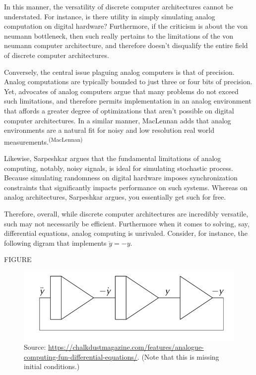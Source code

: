 In this manner, the versatility of discrete computer architectures cannot be understated. For instance, is there utility in simply simulating analog computation on digital hardware? Furthermore, if the criticism is about the von neumann bottleneck, then such really pertains to the limitations of the von neumann computer architecture, and therefore doesn't disqualify the entire field of discrete computer architectures.

Conversely, the central issue plaguing analog computers is that of precision. Analog computations are typically bounded to just three or four bits of precision. Yet, advocates of analog computers argue that many problems do not exceed such limitations, and therefore permits implementation in an analog environment that affords a greater degree of optimizations that aren't possible on digital computer architectures. In a similar manner, MacLennan adds that analog environments are a natural fit for noisy and low resolution real world measurements.\textsuperscript{(MacLennan)}

Likewise, Sarpeshkar argues that the fundamental limitations of analog computing, notably, noisy signals, is ideal for simulating stochastic process. Because simulating randomness on digital hardware imposes synchronization constraints that significantly impacts performance on such systems. Whereas on analog architectures, Sarpeshkar argues, you essentially get such for free.

Therefore, overall, while discrete computer architectures are incredibly versatile, such may not necessarily be efficient. Furthermore when it comes to solving, say, differential equations, analog computing is unrivaled. Consider, for instance, the following digram that implements $\ddot{y} = -y$. 

\ifpdf
  FIGURE
\else
  \begin{figure}[H]
    \centering
    \includegraphics[width=0.8\linewidth,natwidth=500,natheight=226]{../assets/analogue-computing-fun-differential-equations.png}
    \caption{\bibent
    Source: \url{https://chalkdustmagazine.com/features/analogue-computing-fun-differential-equations/}. (Note that this is missing initial conditions.)}
    \label{Image Label}
\end{figure}
\fi

